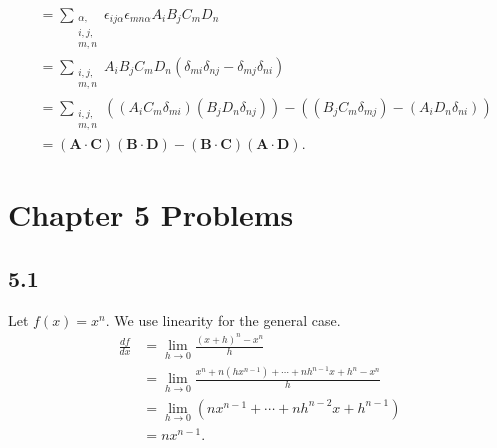 \documentclass[10pt]{mypackage}
\begin{document}
\begin{enumerate}[(a)]
\begin{align*}
                  &= \sum_{\substack{\alpha,\\i,j,\\m,n}}\epsilon_{ij\alpha}\epsilon_{mn\alpha}A_iB_jC_mD_n\\
                  &= \sum_{\substack{i,j,\\m,n}}A_iB_jC_mD_n\left(\delta_{mi}\delta_{nj} - \delta_{mj}\delta_{ni}\right)\\
                  &= \sum_{\substack{i,j,\\m,n}}\left(\left(A_iC_m\delta_{mi}\right)\left(B_jD_n\delta_{nj}\right)\right) - \left(\left(B_jC_m\delta_{mj}\right) - \left(A_iD_n\delta_{ni}\right)\right)\\
                  &= \left(\mathbf{A}\cdot \mathbf{C}\right)\left(\mathbf{B}\cdot \mathbf{D}\right) - \left(\mathbf{B}\cdot \mathbf{C}\right)\left(\mathbf{A}\cdot \mathbf{D}\right).
    \end{align*}
\end{enumerate}
\section{Chapter 5 Problems}%
\subsection{5.1}%
Let $f(x) = x^n$. We use linearity for the general case.
\begin{align*}
  \frac{df}{dx} &= \lim_{h\rightarrow 0}\frac{\left(x + h\right)^n - x^n}{h}\\
                &= \lim_{h\rightarrow 0}\frac{x^n + n\left(hx^{n-1}\right) + \cdots + nh^{n-1}x + h^{n} - x^n }{h}\\
                &= \lim_{h\rightarrow 0}\left(nx^{n-1} + \cdots + nh^{n-2}x + h^{n-1}\right)\\
                &= nx^{n-1}.
\end{align*}
\end{document}
